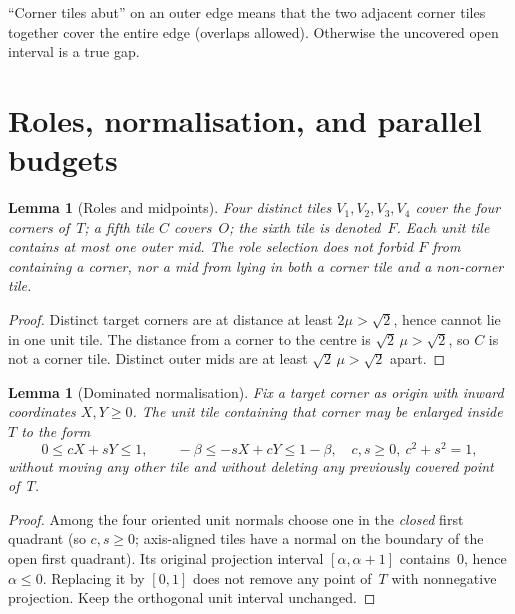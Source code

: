 \documentclass[11pt,reqno]{amsart}
\newtheorem{lemma}[theorem]{Lemma}
\theoremstyle{definition}
\begin{document}
``Corner tiles abut'' on an outer edge means that the two adjacent corner tiles
together cover the entire edge (overlaps allowed).  Otherwise the uncovered
open interval is a true gap.

\section{Roles, normalisation, and parallel budgets}\label{sec:basics}

\begin{lemma}[Roles and midpoints]\label{lem:roles}
Four distinct tiles $V_1,V_2,V_3,V_4$ cover the four corners of~$T$; a fifth
tile $C$ covers~$O$; the sixth tile is denoted~$F$.  Each unit tile contains at
most one outer mid.  The role selection does not forbid $F$ from containing a
corner, nor a mid from lying in both a corner tile and a non-corner tile.
\end{lemma}

\begin{proof}
Distinct target corners are at distance at least $2\mu>\sqrt2$, hence cannot
lie in one unit tile.  The distance from a corner to the centre is
$\sqrt2\,\mu>\sqrt2$, so $C$ is not a corner tile.  Distinct outer mids are at
least $\sqrt2\,\mu>\sqrt2$ apart.
\end{proof}

\begin{lemma}[Dominated normalisation]\label{lem:norm}
Fix a target corner as origin with inward coordinates $X,Y\ge 0$.  The unit
tile containing that corner may be enlarged inside~$T$ to the form
\begin{equation}\label{eq:M2}
0\le cX+sY\le 1,\qquad
-\beta\le -sX+cY\le 1-\beta,
\quad c,s\ge 0,\ c^2+s^2=1,
\end{equation}
without moving any other tile and without deleting any previously covered
point of~$T$.
\end{lemma}

\begin{proof}
Among the four oriented unit normals choose one in the \emph{closed} first
quadrant (so $c,s\ge 0$; axis-aligned tiles have a normal on the boundary of
the open first quadrant).  Its original projection interval
$[\alpha,\alpha+1]$ contains~$0$, hence $\alpha\le 0$.  Replacing it by
$[0,1]$ does not remove any point of~$T$ with nonnegative projection.  Keep
the orthogonal unit interval unchanged.
\end{proof}
\end{document}
